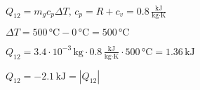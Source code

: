 \( Q_{12} = m_g c_p \Delta T, \, c_p = R + c_v = 0.8 \, \frac{\text{kJ}}{\text{kg·K}} \)  

\( \Delta T = 500 \, \text{°C} - 0 \, \text{°C} = 500 \, \text{°C} \)  

\( Q_{12} = 3.4 \cdot 10^{-3} \, \text{kg} \cdot 0.8 \, \frac{\text{kJ}}{\text{kg·K}} \cdot 500 \, \text{°C} = 1.36 \, \text{kJ} \)  

\( Q_{12} = -2.1 \, \text{kJ} = |Q_{12}| \)